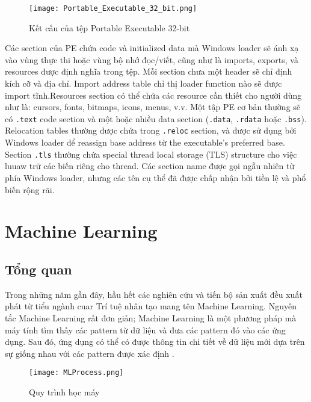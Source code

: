 \begin{figure}[H] 
\centering    
\texttt{[image: Portable\_Executable\_32\_bit.png]}
\caption{Kết cấu của tệp Portable Executable 32-bit \cite{wikipefile}}
\label{fig:pe32bit}
\end{figure}

Các section của PE chứa code và initialized data mà Windows loader sẽ ánh xạ vào vùng thực thi hoặc vùng bộ nhớ đọc/viết, cũng như là imports, exports, và resources được định nghĩa trong tệp. Mỗi section chưa một header sẽ chỉ định kích cỡ và địa chỉ. Import address table chỉ thị loader function nào sẽ được import tĩnh.Resources section có thể chứa các resource cần thiết cho người dùng như là: cursors, fonts, bitmaps, icons, menus, v.v. Một tập PE cơ bản thường sẽ có \verb|.text| code section và một hoặc nhiều data section (\verb|.data|, \verb|.rdata| hoặc \verb|.bss|). Relocation tables thường được chứa trong \verb|.reloc| section, và được sử dụng bởi Windows loader để reassign base address từ the executable’s preferred base. Section \verb|.tls| thường chứa special thread local storage (TLS) structure cho việc luuaw trữ các biến riêng cho thread. Các section name được gọi ngẫu nhiên từ phía Windows loader, nhưng các tên cụ thể đã được chấp nhận bởi tiền lệ và phổ biến rộng rãi.

\section{Machine Learning}

\subsection{Tổng quan}
\label{ssec:machine-learning-intro}

Trong những năm gần đây, hầu hết các nghiên cứu và tiến bộ sản xuất đều xuất phát từ tiểu ngành cuar Trí tuệ nhân tạo mang tên Machine Learning. Nguyên tắc Machine Learning rất đơn giản; Machine Learning là một phương pháp mà máy tính tìm thấy các pattern từ dữ liệu và đưa các pattern đó vào các ứng dụng. Sau đó, ứng dụng có thể có được thông tin chi tiết về dữ liệu mới dựa trên sự giống nhau với các pattern được xác định \cite{martin2016machine}.

\begin{figure}[htbp!] 
\centering    
\texttt{[image: MLProcess.png]}
\caption{Quy trình học máy \cite{martin2016machine}}
\label{fig:ml-process}
\end{figure}

